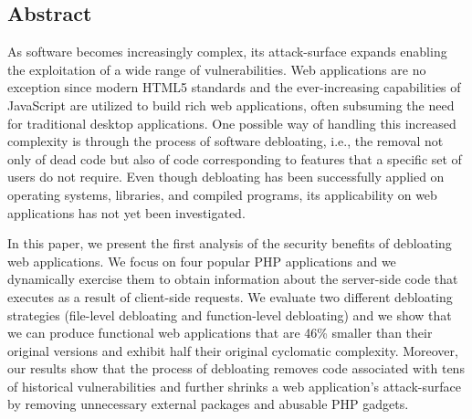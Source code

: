 \subsection*{Abstract}

As software becomes increasingly complex, its attack-surface expands enabling
the exploitation of a wide range of vulnerabilities. Web applications are no
exception since modern HTML5 standards and the ever-increasing capabilities
of JavaScript are utilized to build rich web applications, often subsuming
the need for traditional desktop applications. One possible way of handling
this increased complexity is through the process of software debloating, i.e.,
the removal not only of dead code but also of code corresponding to features
that a specific set of users do not require. Even though debloating has been
successfully applied on operating systems, libraries, and compiled programs,
its applicability on web applications has not yet been investigated.

In this paper, we present the first analysis of the security benefits of
debloating web applications. We focus on four popular PHP applications and
we dynamically exercise them to obtain information about the server-side code
that executes as a result of client-side requests. We evaluate two different
debloating strategies (file-level debloating and function-level debloating)
and we show that we can produce functional web applications that are 46\%
smaller than their original versions and exhibit half their original cyclomatic
complexity. Moreover, our results show that the process of debloating removes
code associated with tens of historical vulnerabilities and further shrinks
a web application's attack-surface by removing unnecessary external packages
and abusable PHP gadgets.


